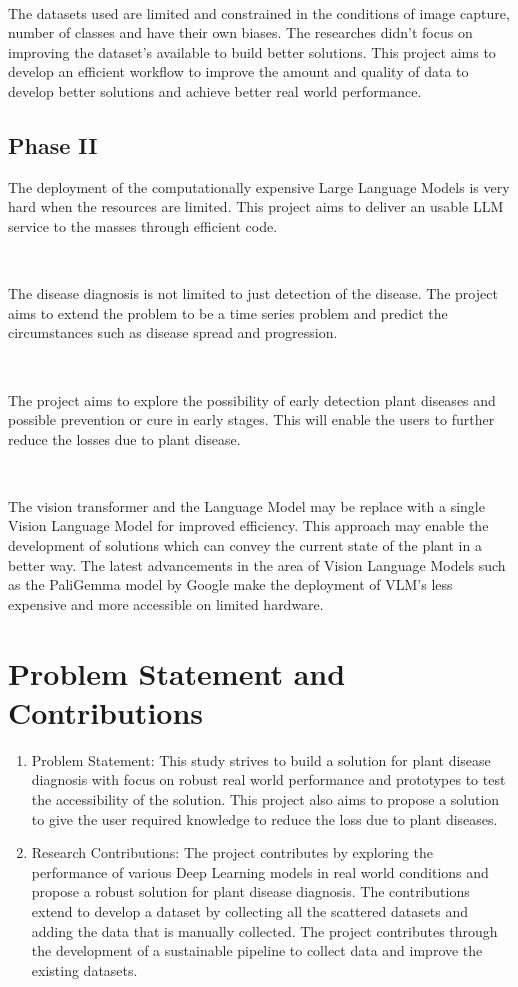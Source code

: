 \

The datasets used are limited and constrained in the conditions of image capture, number of classes and have their own biases. The researches didn't focus on improving the dataset's available to build better solutions. This project aims to develop an efficient workflow to improve the amount and quality of data to develop better solutions and achieve better real world performance.


\subsection{Phase II}

The deployment of the computationally expensive Large Language Models is very hard when the resources are limited. This project aims to deliver an usable LLM service to the masses through efficient code.

\

The disease diagnosis is not limited to just detection of the disease. The project aims to extend the problem to be a time series problem and predict the circumstances such as disease spread and progression.

\

The project aims to explore the possibility of early detection plant diseases and possible prevention or cure in early stages. This will enable the users to further reduce the losses due to plant disease.

\

The vision transformer and the Language Model may be replace with a single Vision Language Model for improved efficiency. This approach may enable the development of solutions which can convey the current state of the plant in a better way. The latest advancements in the area of Vision Language Models such as the PaliGemma model by Google make the deployment of VLM's less expensive and more accessible on limited hardware.



\section{Problem Statement and Contributions}

\begin{enumerate}
    \item Problem Statement: This study strives to build a solution for plant disease diagnosis with focus on robust real world performance and prototypes to test the accessibility of the solution. This project also aims to propose a solution to give the user required knowledge to reduce the loss due to plant diseases.
    \item  Research Contributions: The project contributes by exploring the performance of various Deep Learning models in real world conditions and propose a robust solution for plant disease diagnosis. The contributions extend to develop a dataset by collecting all the scattered datasets and adding the data that is manually collected. The project contributes through the development of a sustainable pipeline to collect data and improve the existing datasets.
\end{enumerate}